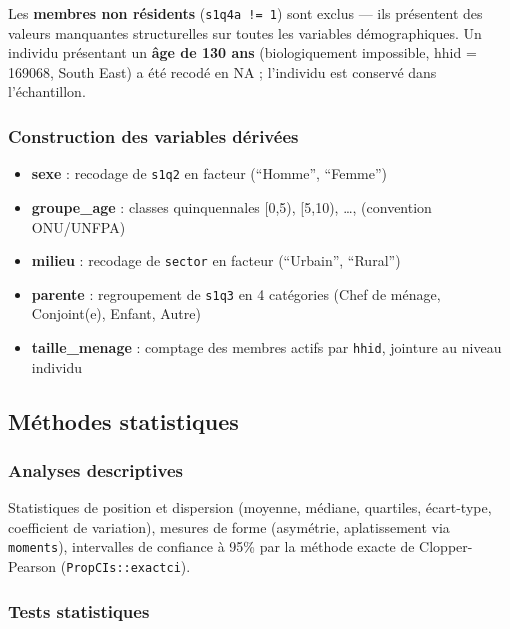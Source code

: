 \documentclass[
  10pt,
]{article}
\providecommand{\tightlist}{%
  \setlength{\itemsep}{0pt}\setlength{\parskip}{0pt}}\usepackage{longtable,booktabs,array}
\begin{document}
Les \textbf{membres non résidents} (\texttt{s1q4a\ !=\ 1}) sont exclus
--- ils présentent des valeurs manquantes structurelles sur toutes les
variables démographiques. Un individu présentant un \textbf{âge de 130
ans} (biologiquement impossible, hhid = 169068, South East) a été recodé
en NA ; l'individu est conservé dans l'échantillon.

\subsubsection{Construction des variables
dérivées}\label{construction-des-variables-duxe9rivuxe9es}

\begin{itemize}
\tightlist
\item
  \textbf{sexe} : recodage de \texttt{s1q2} en facteur (``Homme'',
  ``Femme'')
\item
  \textbf{groupe\_age} : classes quinquennales {[}0,5), {[}5,10),
  \ldots, (convention ONU/UNFPA)
\item
  \textbf{milieu} : recodage de \texttt{sector} en facteur (``Urbain'',
  ``Rural'')
\item
  \textbf{parente} : regroupement de \texttt{s1q3} en 4 catégories (Chef
  de ménage, Conjoint(e), Enfant, Autre)
\item
  \textbf{taille\_menage} : comptage des membres actifs par
  \texttt{hhid}, jointure au niveau individu
\end{itemize}

\subsection{Méthodes statistiques}\label{muxe9thodes-statistiques}

\subsubsection{Analyses descriptives}\label{analyses-descriptives}

Statistiques de position et dispersion (moyenne, médiane, quartiles,
écart-type, coefficient de variation), mesures de forme (asymétrie,
aplatissement via \texttt{moments}), intervalles de confiance à 95\% par
la méthode exacte de Clopper-Pearson (\texttt{PropCIs::exactci}).

\subsubsection{Tests statistiques}\label{tests-statistiques}
\end{document}
